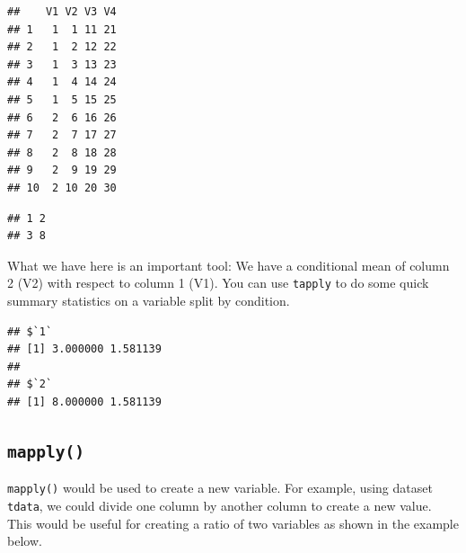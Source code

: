 \documentclass[
]{book}
\newenvironment{Shaded}{\begin{snugshade}}{\end{snugshade}}
\newcommand{\ControlFlowTok}[1]{\textcolor[rgb]{0.13,0.29,0.53}{\textbf{#1}}}
\newcommand{\FunctionTok}[1]{\textcolor[rgb]{0.00,0.00,0.00}{#1}}
\newcommand{\NormalTok}[1]{#1}
\newcommand{\OtherTok}[1]{\textcolor[rgb]{0.56,0.35,0.01}{#1}}
\newcommand{\SpecialCharTok}[1]{\textcolor[rgb]{0.00,0.00,0.00}{#1}}
\begin{document}
\begin{verbatim}
##    V1 V2 V3 V4
## 1   1  1 11 21
## 2   1  2 12 22
## 3   1  3 13 23
## 4   1  4 14 24
## 5   1  5 15 25
## 6   2  6 16 26
## 7   2  7 17 27
## 8   2  8 18 28
## 9   2  9 19 29
## 10  2 10 20 30
\end{verbatim}

\begin{Shaded}
\end{Shaded}

\begin{verbatim}
## 1 2 
## 3 8
\end{verbatim}

What we have here is an important tool: We have a conditional mean of column 2 (V2) with respect to column 1 (V1). You can use \texttt{tapply} to do some quick summary statistics on a variable split by condition.

\begin{Shaded}
\end{Shaded}

\begin{verbatim}
## $`1`
## [1] 3.000000 1.581139
## 
## $`2`
## [1] 8.000000 1.581139
\end{verbatim}

\hypertarget{mapply}{%
\subsection{\texorpdfstring{\texttt{mapply()}}{mapply()}}\label{mapply}}

\texttt{mapply()} would be used to create a new variable. For example, using dataset \texttt{tdata}, we could divide one column by another column to create a new value. This would be useful for creating a ratio of two variables as shown in the example below.

\begin{Shaded}
\end{Shaded}
\end{document}
